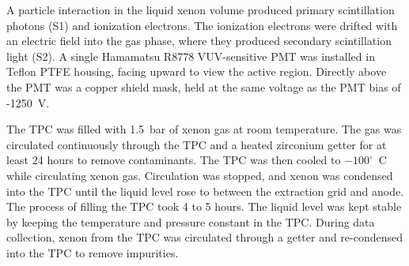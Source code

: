 A particle interaction in the liquid xenon volume produced primary scintillation photons (S1) and ionization electrons. The ionization electrons were drifted with an electric field into the gas phase, where they produced secondary scintillation light (S2). A single Hamamatsu R8778 VUV-sensitive PMT was installed in Teflon PTFE housing, facing upward to view the active region. Directly above the PMT was a copper shield mask, held at the same voltage as the PMT bias of -1250~V.







The TPC was filled with 1.5~bar of xenon gas at room temperature. The gas was circulated continuously through the TPC and a heated zirconium getter for at least 24 hours to remove contaminants. The TPC was then cooled to $-100^{\circ}$~C while circulating xenon gas. Circulation was stopped, and xenon was condensed into the TPC until the liquid level rose to between the extraction grid and anode. The process of filling the TPC took 4 to 5 hours. The liquid level was kept stable by keeping the temperature and pressure constant in the TPC. During data collection, xenon from the TPC was circulated through a getter and re-condensed into the TPC to remove impurities. %

